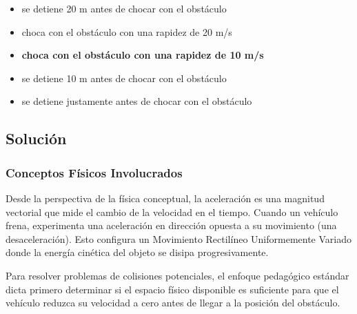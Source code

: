 \documentclass[12pt, a4paper]{article}
\begin{document}
\begin{itemize}
    \item[a)] se detiene 20 m antes de chocar con el obstáculo
    \item[b)] choca con el obstáculo con una rapidez de 20 m/s
    \item[c)] \textbf{choca con el obstáculo con una rapidez de 10 m/s}
    \item[d)] se detiene 10 m antes de chocar con el obstáculo
    \item[e)] se detiene justamente antes de chocar con el obstáculo
\end{itemize}

\vspace{0.5cm}

\begin{center}
\end{center}

\subsection*{Solución}

\subsubsection*{Conceptos Físicos Involucrados}

Desde la perspectiva de la física conceptual, la aceleración es una magnitud vectorial que mide el cambio de la velocidad en el tiempo. Cuando un vehículo frena, experimenta una aceleración en dirección opuesta a su movimiento (una desaceleración). Esto configura un Movimiento Rectilíneo Uniformemente Variado donde la energía cinética del objeto se disipa progresivamente. 

Para resolver problemas de colisiones potenciales, el enfoque pedagógico estándar dicta primero determinar si el espacio físico disponible es suficiente para que el vehículo reduzca su velocidad a cero antes de llegar a la posición del obstáculo.
\end{document}
